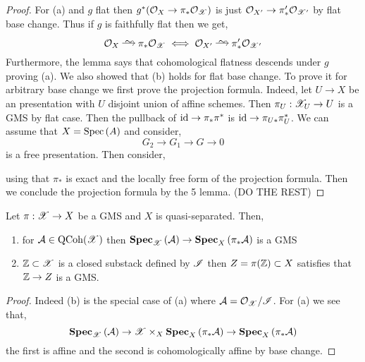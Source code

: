\documentclass[12pt]{article}
\begin{document}
\begin{proof}
For (a) and $g$ flat then $g^* (\mathcal{O}_{X} \to \pi_* \mathcal{O}_{\mathscr{X}})$ is just $\mathcal{O}_{X'} \to \pi_*' \mathcal{O}_{\mathscr{X}'}$ by flat base change. Thus if $g$ is faithfully flat then we get,
\[ \struct{X} \iso \pi_* \struct{\X} \iff \struct{X'} \iso \pi_*' \struct{\X'} \]
Furthermore, the lemma says that cohomological flatness descends under $g$ proving (a). We also showed that (b) holds for flat base change. To prove it for arbitrary base change we first prove the projection formula. Indeed, let $U \to X$ be an \etale presentation with $U$ disjoint union of affine schemes. Then $\pi_U : \mathscr{X}_U \to U$ is a GMS by flat case. Then the pullback of $\mathrm{id} \to \pi_* \pi^*$ is $\mathrm{id} \to \pi_{U*} \pi_U^*$. We can assume that $X = \mathrm{Spec}\left( A \right)$ and consider,
\[ G_2 \to G_1 \to G \to 0 \]
is a free presentation. Then consider,
\begin{center}
\end{center}
using that $\pi_*$ is exact and the locally free form of the projection formula. Then we conclude the projection formula by the 5 lemma. 
(DO THE REST)
\end{proof}

\begin{lemma}
Let $\pi : \mathscr{X} \to X$ be a GMS and $X$ is quasi-separated. Then,
\begin{enumerate}
\item for $\mathcal{A} \in \mathrm{QCoh}(\mathscr{X})$ then $\mathbf{Spec}_{\mathscr{X}}\left( \mathcal{A} \right) \to \mathbf{Spec}_{X}\left( \pi_* \mathcal{A} \right)$ is a GMS
\item $\mathbb{Z} \subset \mathscr{X}$ is a closed substack defined by $\mathscr{I}$ then $Z = \pi(\mathbb{Z}) \subset X$ satisfies that $\mathbb{Z} \to Z$ is a GMS. 
\end{enumerate}
\end{lemma}

\begin{proof}
Indeed (b) is the special case of (a) where $\mathcal{A} = \mathcal{O}_{\mathscr{X}} / \mathscr{I}$. For (a) we see that,
\[ \mathbf{Spec}_{\mathscr{X}}\left( \mathcal{A} \right) \to \mathscr{X} \times_{X} \mathbf{Spec}_{X}\left( \pi_* \mathcal{A} \right) \to \mathbf{Spec}_{X}\left( \pi_* \mathcal{A} \right) \]
the first is affine and the second is cohomologically affine by base change. 
\end{proof}
\end{document}
